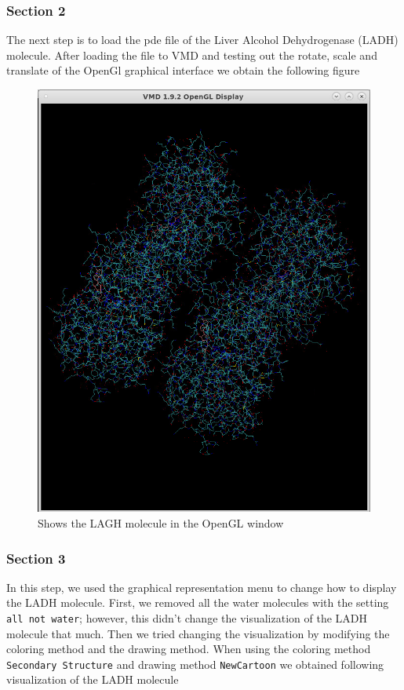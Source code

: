 \documentclass[11pt]{article}
\makeatletter
\def\maxwidth{\ifdim\Gin@nat@width>\linewidth\linewidth
    \else\Gin@nat@width\fi}
\let\Oldincludegraphics\includegraphics
\renewcommand{\includegraphics}[1]{\Oldincludegraphics[width=.8\maxwidth]{#1}}
\makeatother
\begin{document}
\subsubsection{Section 2}\label{section-2}

The next step is to load the pde file of the Liver Alcohol Dehydrogenase
(LADH) molecule. After loading the file to VMD and testing out the
rotate, scale and translate of the OpenGl graphical interface we obtain
the following figure

\begin{figure}
\centering
\includegraphics{Screenshot_ladh_in_opengl.png}
\caption{Shows the LAGH molecule in the OpenGL window}
\end{figure}

\subsubsection{Section 3}\label{section-3}

In this step, we used the graphical representation menu to change how to
display the LADH molecule. First, we removed all the water molecules
with the setting \texttt{all\ not\ water}; however, this didn't change
the visualization of the LADH molecule that much. Then we tried changing
the visualization by modifying the coloring method and the drawing
method. When using the coloring method \texttt{Secondary\ Structure} and
drawing method \texttt{NewCartoon} we obtained following visualization
of the LADH molecule
\end{document}

